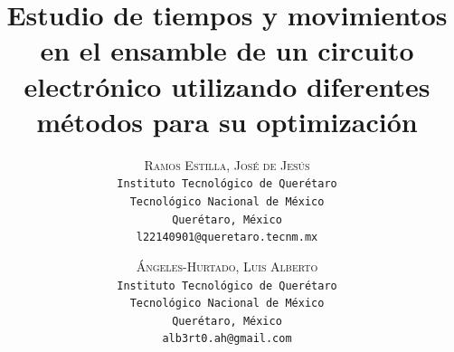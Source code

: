     \lfoot{ \thepage}
    
    \setlength{\droptitle}{-5\baselineskip} %
    \title{\textbf{Estudio de tiempos y movimientos en el ensamble de un circuito electrónico utilizando diferentes métodos para su optimización }} %
    
     \author{ 
     \textsc{Ramos Estilla, José de Jesús}\\ 
     \texttt{ Instituto Tecnológico de Querétaro } \\ 
     \texttt{ Tecnológico Nacional de México } \\ 
     \texttt{Querétaro, México}\\ 
     \texttt{l22140901@queretaro.tecnm.mx} 
     \and 
     \textsc{Ángeles-Hurtado, Luis Alberto}\\ 
     \texttt{ Instituto Tecnológico de Querétaro } \\ 
     \texttt{ Tecnológico Nacional de México } \\ 
     \texttt{Querétaro, México}\\ 
     \texttt{alb3rt0.ah@gmail.com} 
    }
    
    
    
    
